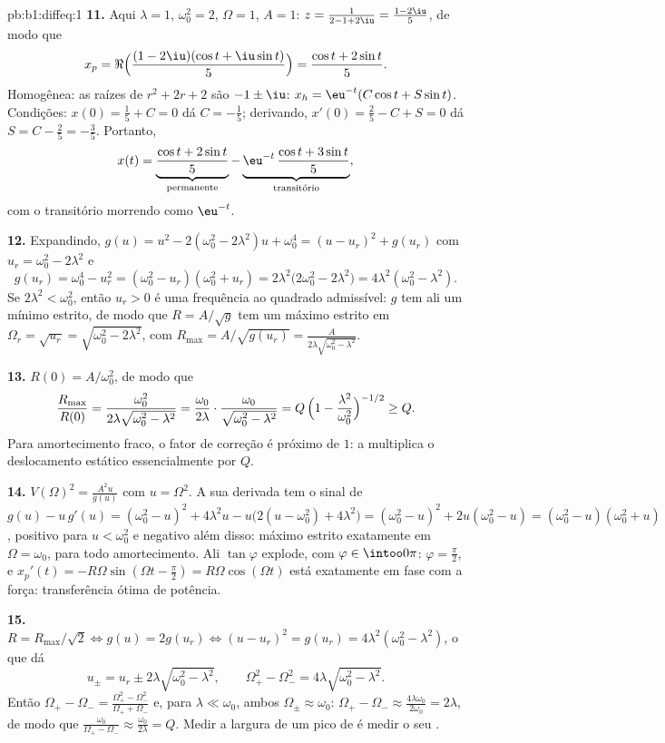 \begin{solution}{pb:b1:diffeq:1}
\textbf{11.} Aqui $\lambda = 1$, $\omega_0^2 = 2$, $\Omega = 1$,
$A = 1$: $z = \frac1{2 - 1 + 2\iu} = \frac{1 - 2\iu}5$, de modo que
\[
x_p = \Re\Bigl(\frac{(1 - 2\iu)(\cos t + \iu\sin t)}5\Bigr)
= \frac{\cos t + 2\sin t}5 .
\]
Homogênea: as raízes de $r^2 + 2r + 2$ são $-1 \pm \iu$: $x_h =
\eu^{-t}(C\cos t + S\sin t)$. Condições: $x(0) = \frac15 + C = 0$
dá $C = -\frac15$; derivando, $x'(0) = \frac25 - C + S =
0$
dá $S = C - \frac25 = -\frac35$. Portanto,
\[
x(t) = \underbrace{\frac{\cos t + 2\sin t}5}_{\text{permanente}}
- \underbrace{\eu^{-t}\,\frac{\cos t + 3\sin
t}5}_{\text{transitório}} ,
\]
com o transitório morrendo como $\eu^{-t}$.

\textbf{12.} Expandindo, $g(u) = u^2 - 2(\omega_0^2 - 2\lambda^2)u
+ \omega_0^4 = (u - u_r)^2 + g(u_r)$ com $u_r = \omega_0^2 -
2\lambda^2$ e
\[
g(u_r) = \omega_0^4 - u_r^2 = (\omega_0^2 - u_r)(\omega_0^2 +
u_r) = 2\lambda^2\bigl(2\omega_0^2 - 2\lambda^2\bigr) =
4\lambda^2(\omega_0^2 - \lambda^2) .
\]
Se $2\lambda^2 < \omega_0^2$, então $u_r > 0$ é uma frequência ao quadrado
admissível: $g$ tem ali um mínimo estrito, de modo que $R = A/\sqrt
g$ tem um máximo estrito em $\Omega_r = \sqrt{u_r} =
\sqrt{\omega_0^2 - 2\lambda^2}$, com $R_{\max} = A/\sqrt{g(u_r)}
= \frac{A}{2\lambda\sqrt{\omega_0^2 - \lambda^2}}$.

\textbf{13.} $R(0) = A/\omega_0^2$, de modo que
\[
\frac{R_{\max}}{R(0)}
= \frac{\omega_0^2}{2\lambda\sqrt{\omega_0^2 - \lambda^2}}
= \frac{\omega_0}{2\lambda}\cdot
\frac{\omega_0}{\sqrt{\omega_0^2 - \lambda^2}}
= Q\,\Bigl(1 - \frac{\lambda^2}{\omega_0^2}\Bigr)^{-1/2}
\geq Q .
\]
Para amortecimento fraco, o fator de correção é próximo de $1$: a
 multiplica o deslocamento estático essencialmente por $Q$.

\textbf{14.} $V(\Omega)^2 = \frac{A^2 u}{g(u)}$ com $u =
\Omega^2$. A sua derivada tem o sinal de $g(u) - u\,g'(u) =
(\omega_0^2 - u)^2 + 4\lambda^2 u - u\bigl(2(u - \omega_0^2) +
4\lambda^2\bigr) = (\omega_0^2 - u)^2 + 2u(\omega_0^2 - u) =
(\omega_0^2 - u)(\omega_0^2 + u)$, positivo para $u < \omega_0^2$
e negativo além disso: máximo estrito exatamente em $\Omega =
\omega_0$, para todo amortecimento. Ali $\tan\varphi$ explode, com
$\varphi \in \intoo0\pi$: $\varphi = \frac\pi2$, e $x_p'(t) =
-R\Omega\sin(\Omega t - \frac\pi2) = R\Omega\cos(\Omega t)$ está
exatamente em fase com a força: transferência ótima de potência.

\textbf{15.} $R = R_{\max}/\sqrt2 \iff g(u) = 2g(u_r) \iff (u -
u_r)^2 = g(u_r) = 4\lambda^2(\omega_0^2 - \lambda^2)$, o que dá
\[
u_\pm = u_r \pm 2\lambda\sqrt{\omega_0^2 - \lambda^2},
\qquad
\Omega_+^2 - \Omega_-^2 = 4\lambda\sqrt{\omega_0^2 - \lambda^2} .
\]
Então $\Omega_+ - \Omega_- = \frac{\Omega_+^2 -
\Omega_-^2}{\Omega_+ + \Omega_-}$ e, para $\lambda \ll \omega_0$,
ambos $\Omega_\pm \approx \omega_0$: $\Omega_+ - \Omega_- \approx
\frac{4\lambda\omega_0}{2\omega_0} = 2\lambda$, de modo que
$\frac{\omega_0}{\Omega_+ - \Omega_-} \approx
\frac{\omega_0}{2\lambda} = Q$. Medir a largura de um pico de  é
medir o seu .


\end{solution}
